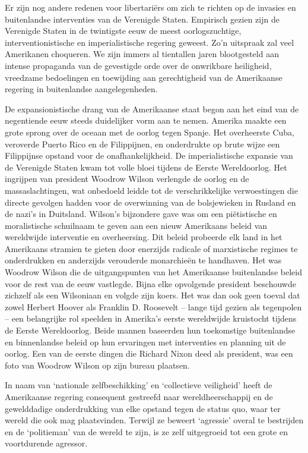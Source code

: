 \documentclass[
  a5paper,
  smalldemyvopaper,10pt,twoside,onecolumn,openright,extrafontsizes,hidelinks]{memoir}
\begin{document}
Er zijn nog andere redenen voor libertariërs om zich te richten op de
invasies en buitenlandse interventies van de Verenigde Staten. Empirisch
gezien zijn de Verenigde Staten in de twintigste eeuw de meest
oorlogszuchtige, interventionistische en imperialistische regering
geweest. Zo'n uitspraak zal veel Amerikanen choqueren. We zijn immers al
tientallen jaren blootgesteld aan intense propaganda van de gevestigde
orde over de onwrikbare heiligheid, vreedzame bedoelingen en toewijding
aan gerechtigheid van de Amerikaanse regering in buitenlandse
aangelegenheden.

De expansionistische drang van de Amerikaanse staat begon aan het eind
van de negentiende eeuw steeds duidelijker vorm aan te nemen. Amerika
maakte een grote sprong over de oceaan met de oorlog tegen Spanje. Het
overheerste Cuba, veroverde Puerto Rico en de Filippijnen, en
onderdrukte op brute wijze een Filippijnse opstand voor de
onafhankelijkheid. De imperialistische expansie van de Verenigde Staten
kwam tot volle bloei tijdens de Eerste Wereldoorlog. Het ingrijpen van
president Woodrow Wilson verlengde de oorlog en de massaslachtingen, wat
onbedoeld leidde tot de verschrikkelijke verwoestingen die directe
gevolgen hadden voor de overwinning van de bolsjewieken in Rusland en de
nazi's in Duitsland. Wilson's bijzondere gave was om een piëtistische en
moralistische schuilnaam te geven aan een nieuw Amerikaans beleid van
wereldwijde interventie en overheersing. Dit beleid probeerde elk land
in het Amerikaans stramien te gieten door enerzijds radicale of
marxistische regimes te onderdrukken en anderzijds verouderde
monarchieën te handhaven. Het was Woodrow Wilson die de uitgangspunten
van het Amerikaanse buitenlandse beleid voor de rest van de eeuw
vastlegde. Bijna elke opvolgende president beschouwde zichzelf als een
Wilsoniaan en volgde zijn koers. Het was dan ook geen toeval dat zowel
Herbert Hoover als Franklin D. Roosevelt -- lange tijd gezien als
tegenpolen -- een belangrijke rol speelden in Amerika's eerste
wereldwijde kruistocht tijdens de Eerste Wereldoorlog. Beide mannen
baseerden hun toekomstige buitenlandse en binnenlandse beleid op hun
ervaringen met interventies en planning uit de oorlog. Een van de eerste
dingen die Richard Nixon deed als president, was een foto van Woodrow
Wilson op zijn bureau plaatsen.

In naam van `nationale zelfbeschikking' en `collectieve veiligheid'
heeft de Amerikaanse regering consequent gestreefd naar
wereldheerschappij en de gewelddadige onderdrukking van elke opstand
tegen de status quo, waar ter wereld die ook mag plaatsvinden. Terwijl
ze beweert `agressie' overal te bestrijden en de `politieman' van de
wereld te zijn, is ze zelf uitgegroeid tot een grote en voortdurende
agressor.
\end{document}
